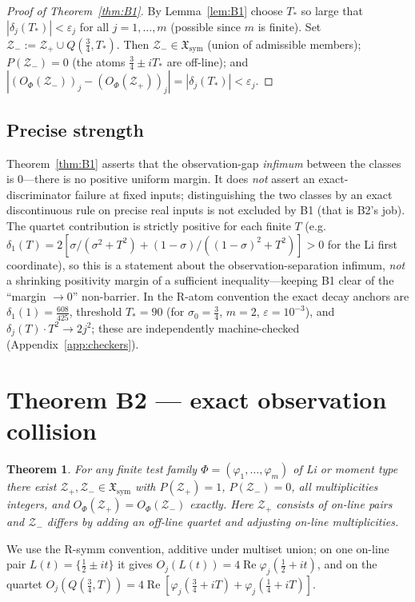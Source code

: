 \documentclass[11pt]{article}
\theoremstyle{plain}
\newtheorem{theorem}{Theorem}
\theoremstyle{definition}
\theoremstyle{remark}
\newcommand{\Xsym}{\mathfrak{X}_{\mathrm{sym}}}
\newcommand{\Zp}{\mathcal{Z}_+}
\newcommand{\Zm}{\mathcal{Z}_-}
\begin{document}
\begin{proof}[Proof of Theorem~\ref{thm:B1}]
By Lemma~\ref{lem:B1} choose $T_*$ so large that $|\delta_j(T_*)|<\varepsilon_j$ for all
$j=1,\dots,m$ (possible since $m$ is finite). Set $\Zm:=\Zp\cup Q(\tfrac34,T_*)$. Then
$\Zm\in\Xsym$ (union of admissible members); $P(\Zm)=0$ (the atoms $\tfrac34\pm iT_*$ are
off-line); and $|(O_\Phi(\Zm))_j-(O_\Phi(\Zp))_j|=|\delta_j(T_*)|<\varepsilon_j$.
\end{proof}

\subsection{Precise strength}
Theorem~\ref{thm:B1} asserts that the observation-gap \emph{infimum} between the classes is
$0$---there is no positive uniform margin. It does \emph{not} assert an exact-discriminator
failure at fixed inputs; distinguishing the two classes by an exact discontinuous rule on
precise real inputs is not excluded by B1 (that is B2's job). The quartet contribution is
strictly positive for each finite $T$ (e.g.\
$\delta_1(T)=2[\sigma/(\sigma^2+T^2)+(1-\sigma)/((1-\sigma)^2+T^2)]>0$ for the Li first
coordinate), so this is a statement about the observation-separation infimum, \emph{not} a
shrinking positivity margin of a sufficient inequality---keeping B1 clear of the
``margin $\to 0$'' non-barrier. In the R-atom convention the exact decay anchors are
$\delta_1(1)=\tfrac{608}{425}$, threshold $T_*=90$ (for $\sigma_0=\tfrac34$, $m=2$,
$\varepsilon=10^{-3}$), and $\delta_j(T)\cdot T^2\to 2j^2$; these are independently
machine-checked (Appendix~\ref{app:checkers}).

\section{Theorem B2 --- exact observation collision}\label{sec:B2}

\begin{theorem}\label{thm:B2}
For any finite test family $\Phi=(\varphi_1,\dots,\varphi_m)$ of Li or moment type there exist
$\Zp,\Zm\in\Xsym$ with $P(\Zp)=1$, $P(\Zm)=0$, all multiplicities integers, and
$O_\Phi(\Zp)=O_\Phi(\Zm)$ exactly. Here $\Zp$ consists of on-line pairs and $\Zm$ differs by
adding an off-line quartet and adjusting on-line multiplicities.
\end{theorem}

We use the R-symm convention, additive under multiset union; on one on-line pair
$L(t)=\{\tfrac12\pm it\}$ it gives $O_j(L(t))=4\operatorname{Re}\varphi_j(\tfrac12+it)$, and on the quartet
$O_j(Q(\tfrac34,T))=4\operatorname{Re}[\varphi_j(\tfrac34+iT)+\varphi_j(\tfrac14+iT)]$.
\end{document}
